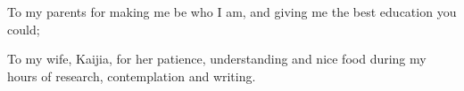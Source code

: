 
\cleardoublepage

{}

\begin{dedication}

To my parents for making me be who I am, and giving me the best education you could;

To my wife, Kaijia, for her patience, understanding and nice food during my hours of research, contemplation and writing.

\end{dedication}
